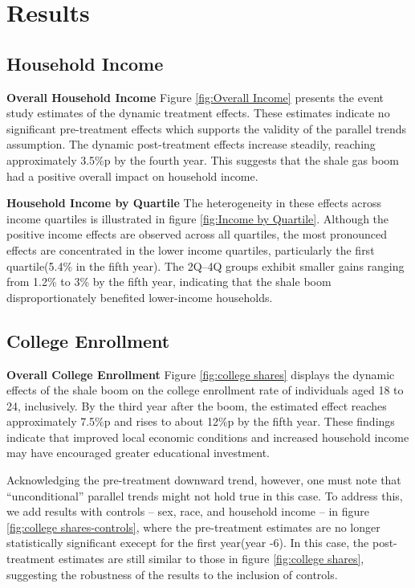 \section{Results}
\label{sec:results}


\subsection{Household Income}
\textbf{Overall Household Income} \hspace{0.1cm}
Figure \ref{fig:Overall Income} presents the event study estimates of the dynamic treatment effects.
These estimates indicate no significant pre-treatment effects which supports the validity of the parallel trends assumption. 
The dynamic post-treatment effects increase steadily, reaching approximately 3.5\%p by the fourth year.
This suggests that the shale gas boom had a positive overall impact on household income.

\textbf{Household Income by Quartile} \hspace{0.1cm}
The heterogeneity in these effects across income quartiles is illustrated in figure \ref{fig:Income by Quartile}.
Although the positive income effects are observed across all quartiles, the most pronounced effects are concentrated in the lower income quartiles, particularly the first quartile(5.4\% in the fifth year).
The 2Q–4Q groups exhibit smaller gains ranging from 1.2\% to 3\% by the fifth year,
indicating that the shale boom disproportionately benefited lower-income households.



\subsection{College Enrollment}
\textbf{Overall College Enrollment} \hspace{0.1cm}
Figure \ref{fig:college shares} displays the dynamic effects of the shale boom on the college enrollment rate of 
individuals aged 18 to 24, inclusively.
By the third year after the boom, the estimated effect reaches approximately 7.5\%p and rises to about 12\%p by the fifth year.
These findings indicate that improved local economic conditions and increased household income may have encouraged greater educational investment.

Acknowledging the pre-treatment downward trend, however, one must note that ``unconditional'' parallel trends 
might not hold true in this case. To address this, we add results with controls – sex, race, and household income – in figure \ref{fig:college shares-controls},
where the pre-treatment estimates are no longer statistically significant execept for the first year(year -6).
In this case, the post-treatment estimates are still similar to those in figure \ref{fig:college shares}, suggesting the robustness of the results to the inclusion of controls.

